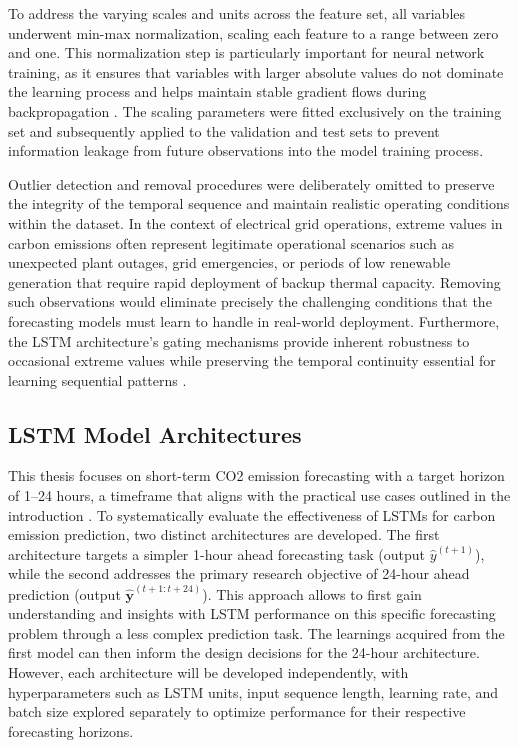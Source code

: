 To address the varying scales and units across the feature set, all variables underwent min-max normalization, scaling each feature to a range between zero and one. This normalization step is particularly important for neural network training, as it ensures that variables with larger absolute values do not dominate the learning process and helps maintain stable gradient flows during backpropagation \parencite{goodfellow2016}. The scaling parameters were fitted exclusively on the training set and subsequently applied to the validation and test sets to prevent information leakage from future observations into the model training process.

Outlier detection and removal procedures were deliberately omitted to preserve the integrity of the temporal sequence and maintain realistic operating conditions within the dataset. In the context of electrical grid operations, extreme values in carbon emissions often represent legitimate operational scenarios such as unexpected plant outages, grid emergencies, or periods of low renewable generation that require rapid deployment of backup thermal capacity. Removing such observations would eliminate precisely the challenging conditions that the forecasting models must learn to handle in real-world deployment. Furthermore, the LSTM architecture's gating mechanisms provide inherent robustness to occasional extreme values while preserving the temporal continuity essential for learning sequential patterns \parencite{goodfellow2016}.

\subsection{LSTM Model Architectures}
\label{subsec:lstm-model-architecture}

This thesis focuses on short-term CO2 emission forecasting with a target horizon of 1--24 hours, a timeframe that aligns with the practical use cases outlined in the introduction \parencite{entsoe2022,futurebridge}. To systematically evaluate the effectiveness of LSTMs for carbon emission prediction, two distinct architectures are developed. The first architecture targets a simpler 1-hour ahead forecasting task (output \(\hat{y}^{(t+1)}\)), while the second addresses the primary research objective of 24-hour ahead prediction (output \(\mathbf{\hat{y}}^{(t+1:t+24)}\)). This approach allows to first gain understanding and insights with LSTM performance on this specific forecasting problem through a less complex prediction task. The learnings acquired from the first model can then inform the design decisions for the 24-hour architecture. However, each architecture will be developed independently, with hyperparameters such as LSTM units, input sequence length, learning rate, and batch size explored separately to optimize performance for their respective forecasting horizons.


